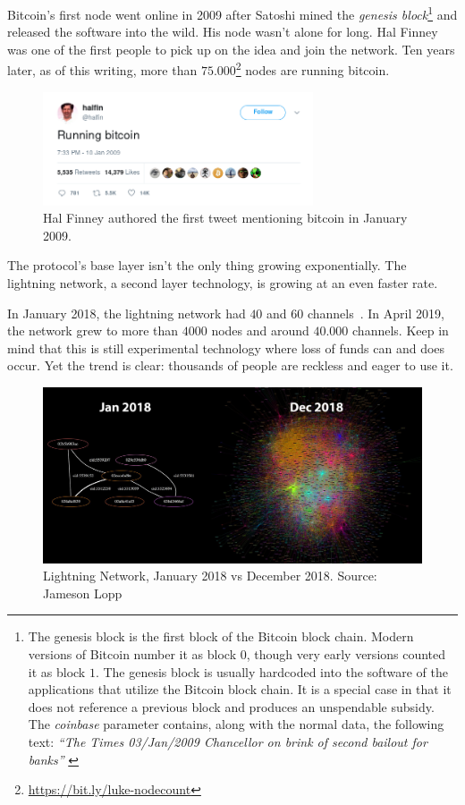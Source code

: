 Bitcoin's first node went online in 2009 after Satoshi mined the \textit{genesis
block}\footnote{The genesis block is the first block of the Bitcoin block chain.
Modern versions of Bitcoin number it as block $0$, though very early versions
counted it as block $1$. The genesis block is usually hardcoded into the
software of the applications that utilize the Bitcoin block chain. It is a
special case in that it does not reference a previous block and produces an
unspendable subsidy. The \textit{coinbase} parameter contains, along with the
normal data, the following text: \textit{\enquote{The Times 03/Jan/2009 Chancellor on
brink of second bailout for banks}} \cite{btcwiki:genesis-block}} and released
the software into the wild. His node wasn't alone for long. Hal Finney was one
of the first people to pick up on the idea and join the network. Ten years
later, as of this writing, more than
$75.000$\footnote{\url{https://bit.ly/luke-nodecount}} nodes are running
bitcoin.

\begin{figure}
  \centering
  \includegraphics[width=8cm]{assets/images/running-bitcoin.png}
  \caption{Hal Finney authored the first tweet mentioning bitcoin in January 2009.}
  \label{fig:running-bitcoin}
\end{figure}

The protocol's base layer isn't the only thing growing exponentially.
The lightning network, a second layer technology, is growing at an even
faster rate.

In January 2018, the lightning network had $40$ and $60$ channels~\cite{web:lightning-nodes}.
In April 2019, the network grew to more than $4000$ nodes and around
$40.000$ channels. Keep in mind that this is still experimental technology
where loss of funds can and does occur. Yet the trend is clear:
thousands of people are reckless and eager to use it.

\begin{figure}
  \includegraphics{assets/images/lnd-growth-lopp-black.png}
  \caption{Lightning Network, January 2018 vs December 2018. Source: Jameson Lopp}
  \label{fig:lnd-growth-lopp-black.png}
\end{figure}

